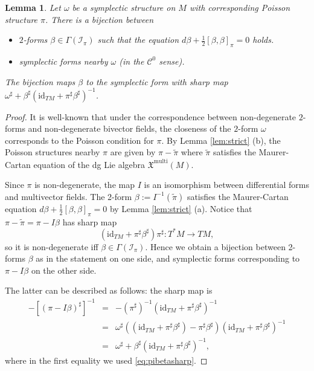 \documentclass[11pt,thmsa]{amsart}
\newtheorem{lemma}[theorem]{Lemma}
\theoremstyle{definition}
\begin{document}
\begin{lemma}\label{lem:phibinv}
Let $\omega$ be a symplectic structure on $M$ with corresponding Poisson structure $\pi$.
There is a bijection between
\begin{itemize}
\item $2$-forms $\beta \in \Gamma(\mathcal{I}_\pi)$ such that the equation $ d\beta +\frac{1}{2}[\beta,\beta]_\pi=0$ holds.
\item symplectic forms nearby $\omega$ (in the $\mathcal{C}^0$ sense).
\end{itemize}

The bijection maps $\beta$ to the symplectic form with sharp map $\omega^\sharp + \beta^\sharp(\mathrm{id}_{TM}+\pi^\sharp\beta^\sharp)^{-1}$.
\end{lemma} 



\begin{proof}
It is well-known that under the correspondence between non-degenerate $2$-forms and non-degenerate bivector fields, the closeness of the $2$-form $\omega$ corresponds to the Poisson condition for $\pi$. 
By Lemma \ref{lem:strict} (b), the Poisson structures  nearby $\pi$ are given by $\pi-\tilde{\pi}$ where $\tilde{\pi}$ satisfies the Maurer-Cartan equation of the dg Lie algebra $\mathfrak{X}^\mathrm{multi}(M)$. 


Since   $\pi$ is non-degenerate, the map $I$   is an isomorphism between differential forms and multivector fields.
The 2-form $\beta:=I^{-1}(\tilde{\pi})$ satisfies the Maurer-Cartan equation $ d\beta +\frac{1}{2}[\beta,\beta]_\pi=0$  by Lemma \ref{lem:strict} (a). Notice that  $\pi-\tilde{\pi}=\pi-I\beta$ has sharp map 
\begin{equation}\label{eq:pibetasharp}
(\mathrm{id}_{TM}+\pi^{\sharp}\beta^\sharp)\pi^\sharp\colon T^*M\to TM,  
\end{equation}
 so it is non-degenerate if{f} $\beta \in \Gamma(\mathcal{I}_\pi)$. Hence we obtain a bijection between  2-forms $\beta$ as in the statement on one side, and symplectic forms
corresponding to $\pi-I\beta$ on the other side.



The latter can be described as follows:
the sharp map is
\begin{eqnarray*}
-[(\pi-I\beta)^{\sharp}]^{-1}&=&
-(\pi^\sharp)^{-1}(\mathrm{id}_{TM}+\pi^{\sharp}\beta^\sharp)^{-1}\\
&=&\omega^\sharp((\mathrm{id}_{TM} + \pi^\sharp\beta^\sharp) - \pi^\sharp\beta^\sharp)(\mathrm{id}_{TM}+\pi^\sharp\beta^\sharp)^{-1}\\
&=&\omega^\sharp + \beta^\sharp(\mathrm{id}_{TM}+\pi^\sharp\beta^\sharp)^{-1},
\end{eqnarray*}
where in the first equality we used  \eqref{eq:pibetasharp}.
  \end{proof}
\end{document}
